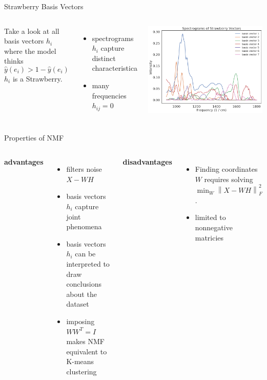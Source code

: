 \documentclass[aspectratio=169]{beamer}
\begin{document}
\begin{frame}{Strawberry Basis Vectors}

	\begin{columns}
		Take a look at all basis vectors $h_i$ where the model thinks 
		\begin{equation*}
		\hat{y}(e_i) > 1 - \hat{y}(e_i)
		\end{equation*}
		$h_i$ is a Strawberry.
		\begin{itemize}
		\item spectrograms $h_i$ capture distinct characteristica
		\item many frequencies $h_{i j} = 0$
		\end{itemize}

			\includegraphics[width=\linewidth]{images/strawberry_basis_vectors.png}
	\end{columns}
\end{frame}

\begin{frame}{Properties of NMF}
	\begin{columns}[t]

	\column{0.55 \textwidth}
	\textbf{advantages}
	\begin{itemize}
	\item filters noise $X - W H $
	\item basis vectors $h_i$ capture joint phenomena
	\item basis vectors $h_i$ can be interpreted to draw conclusions about the dataset
	\item imposing $W W^T  = I $ makes NMF equivalent to K-means clustering
	\end{itemize}
	\column{0.45 \textwidth}
	\textbf{disadvantages}
	\begin{itemize}
	\item Finding coordinates $W$ requires solving $\min_{ W}  \left\lVert X - W H\right\rVert^2_F$.
	\item limited to nonnegative matricies
	\end{itemize}
	\end{columns}
\end{frame}
\end{document}
